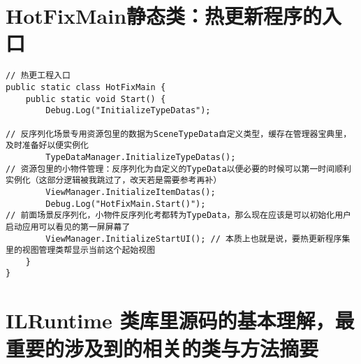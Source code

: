 \documentclass[9pt, b5paper]{article}
\begin{document}
\section{HotFixMain静态类：热更新程序的入口}
\label{sec-4}
\begin{verbatim}
// 热更工程入口
public static class HotFixMain {
    public static void Start() {
        Debug.Log("InitializeTypeDatas");

// 反序列化场景专用资源包里的数据为SceneTypeData自定义类型，缓存在管理器宝典里，及时准备好以便实例化
        TypeDataManager.InitializeTypeDatas(); 
// 资源包里的小物件管理：反序列化为自定义的TypeData以便必要的时候可以第一时间顺利实例化（这部分逻辑被我跳过了，改天若是需要参考再补）
        ViewManager.InitializeItemDatas();
        Debug.Log("HotFixMain.Start()");
// 前面场景反序列化，小物件反序列化考都转为TypeData，那么现在应该是可以初始化用户启动应用可以看见的第一屏屏幕了
        ViewManager.InitializeStartUI(); // 本质上也就是说，要热更新程序集里的视图管理类帮显示当前这个起始视图
    }
}
\end{verbatim}

\section{ILRuntime 类库里源码的基本理解，最重要的涉及到的相关的类与方法摘要}
\label{sec-5}
\end{document}
